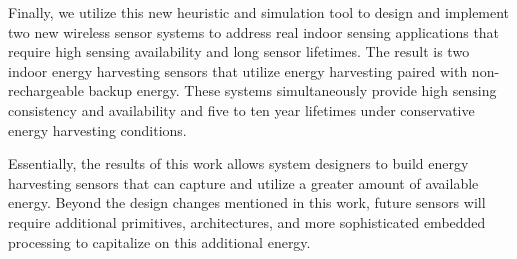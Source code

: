 Finally, we utilize this new heuristic and simulation tool to design and implement two new wireless sensor systems to address real indoor sensing applications that require high sensing availability and long sensor lifetimes.
The result is two indoor energy harvesting sensors that utilize energy harvesting paired with non-rechargeable backup energy. 
These systems simultaneously provide high sensing consistency and availability and five to ten year lifetimes under conservative energy harvesting conditions.

Essentially, the results of this work allows system designers to build energy harvesting sensors that can capture and utilize a greater amount of available energy. 
Beyond the design changes mentioned in this work, future sensors will require additional primitives, architectures, and more sophisticated embedded processing to capitalize on this additional energy. 

